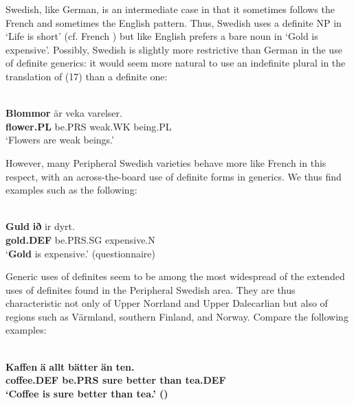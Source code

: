 
Swedish, like German, is an intermediate case in that it sometimes follows the French and sometimes the English pattern. Thus, Swedish uses a definite NP in  ‘Life is short’ (cf. French ) but like English prefers a bare noun in  ‘Gold is expensive’. Possibly, Swedish is slightly more restrictive than German in the use of definite generics: it would seem more natural to use an indefinite plural in the translation of (17) than a definite one:


\ea\label{}
\\
\gll	\textbf{Blommor} är  veka  varelser.\\
		\textbf{flower.PL} be.PRS  weak.WK  being.PL\\
\glt	‘Flowers are weak beings.’

\z

However, many Peripheral Swedish varieties behave more like French in this respect, with an across-the-board use of definite forms in generics. We thus find examples such as the following:


\ea\label{}
\\
\gll	\textbf{Guld} \textbf{ið} ir  dyrt.  \\
		\textbf{gold.DEF} be.PRS.SG  expensive.N  \\
\glt	‘\textbf{Gold} is expensive.’ (questionnaire)

\z

Generic uses of definites seem to be among the most widespread of the extended uses of definites found in the Peripheral Swedish area. They are thus characteristic not only of Upper Norrland and Upper Dalecarlian but also of regions such as Värmland, southern Finland, and Norway. Compare the following examples:


\ea\label{}
\\
\gll	\textbf{Kaffen} \textbf{ä} \textbf{  allt} \textbf{  bätter} \textbf{  än} \textbf{ten.}\\
		\bfseries coffee.DEF  be.PRS  sure  better   than  tea.DEF\\
\glt	‘Coffee is sure better than tea.’ (\citet{Broberg1936})

